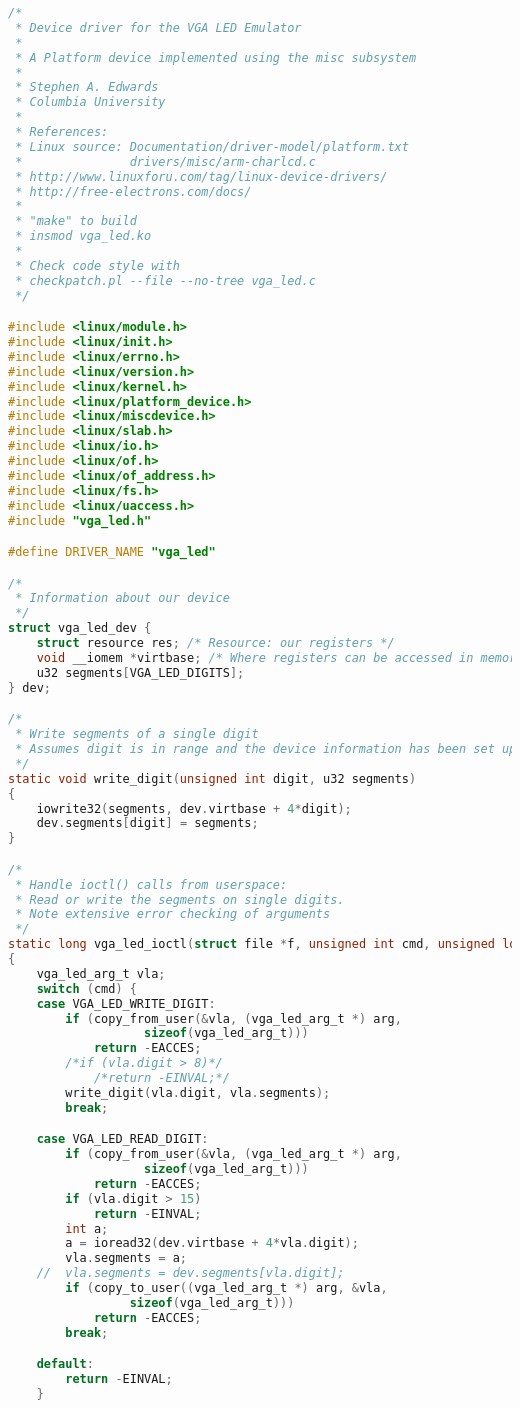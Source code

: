 \documentclass[twoside,12pt,fleqn]{book} %
\begin{document}
\begin{lstlisting}[language=C]
/*
 * Device driver for the VGA LED Emulator
 *
 * A Platform device implemented using the misc subsystem
 *
 * Stephen A. Edwards
 * Columbia University
 *
 * References:
 * Linux source: Documentation/driver-model/platform.txt
 *               drivers/misc/arm-charlcd.c
 * http://www.linuxforu.com/tag/linux-device-drivers/
 * http://free-electrons.com/docs/
 *
 * "make" to build
 * insmod vga_led.ko
 *
 * Check code style with
 * checkpatch.pl --file --no-tree vga_led.c
 */

#include <linux/module.h>
#include <linux/init.h>
#include <linux/errno.h>
#include <linux/version.h>
#include <linux/kernel.h>
#include <linux/platform_device.h>
#include <linux/miscdevice.h>
#include <linux/slab.h>
#include <linux/io.h>
#include <linux/of.h>
#include <linux/of_address.h>
#include <linux/fs.h>
#include <linux/uaccess.h>
#include "vga_led.h"

#define DRIVER_NAME "vga_led"

/*
 * Information about our device
 */
struct vga_led_dev {
	struct resource res; /* Resource: our registers */
	void __iomem *virtbase; /* Where registers can be accessed in memory */
	u32 segments[VGA_LED_DIGITS];
} dev;

/*
 * Write segments of a single digit
 * Assumes digit is in range and the device information has been set up
 */
static void write_digit(unsigned int digit, u32 segments)
{
	iowrite32(segments, dev.virtbase + 4*digit);
	dev.segments[digit] = segments;
}

/*
 * Handle ioctl() calls from userspace:
 * Read or write the segments on single digits.
 * Note extensive error checking of arguments
 */
static long vga_led_ioctl(struct file *f, unsigned int cmd, unsigned long arg)
{
    vga_led_arg_t vla;
	switch (cmd) {
	case VGA_LED_WRITE_DIGIT:
		if (copy_from_user(&vla, (vga_led_arg_t *) arg,
				   sizeof(vga_led_arg_t)))
			return -EACCES;
		/*if (vla.digit > 8)*/
			/*return -EINVAL;*/
		write_digit(vla.digit, vla.segments);
		break;

	case VGA_LED_READ_DIGIT:
		if (copy_from_user(&vla, (vga_led_arg_t *) arg,
				   sizeof(vga_led_arg_t)))
			return -EACCES;
		if (vla.digit > 15)
			return -EINVAL;
		int a;
        a = ioread32(dev.virtbase + 4*vla.digit);
        vla.segments = a;
	//	vla.segments = dev.segments[vla.digit];
		if (copy_to_user((vga_led_arg_t *) arg, &vla,
				 sizeof(vga_led_arg_t)))
			return -EACCES;
		break;

	default:
		return -EINVAL;
	}


\end{lstlisting}
\end{document}
